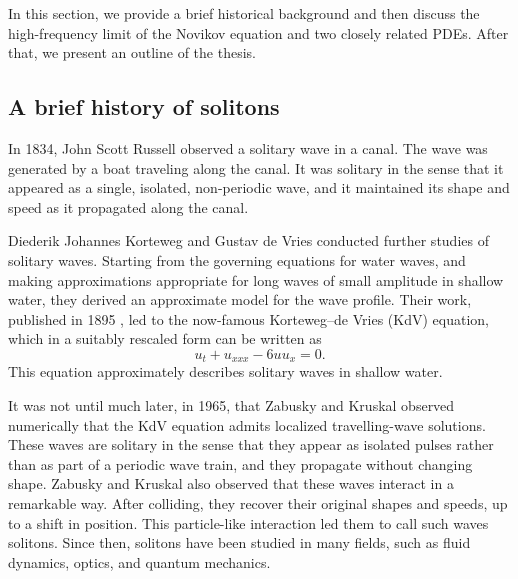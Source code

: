 \documentclass[english,master]{liumaiex}
\theoremstyle{thesisplain}
\theoremstyle{thesisdefinition}
\numberwithin{equation}{section}
\begin{document}
In this section, we provide a brief historical background and then discuss the high-frequency limit of the Novikov equation and two closely related PDEs. After that, we present an outline of the thesis.

\subsection{A brief history of solitons}

In 1834, John Scott Russell observed a solitary wave in a canal. The wave was generated by a boat traveling along the canal. It was solitary in the sense that it appeared as a single, isolated, non-periodic wave, and it maintained its shape and speed as it propagated along the canal.

Diederik Johannes Korteweg and Gustav de Vries conducted further studies of solitary waves. Starting from the governing equations for water waves, and making approximations appropriate for long waves of small amplitude in shallow water, they derived an approximate model for the wave profile. Their work, published in 1895 \cite{Korteweg_1895}, led to the now-famous Korteweg--de Vries (KdV) equation, which in a suitably rescaled form can be written as
\begin{equation}
    u_t + u_{xxx} - 6uu_x = 0.
\end{equation}
This equation approximately describes solitary waves in shallow water.

It was not until much later, in 1965, that Zabusky and Kruskal \cite{Zabusky_1965} observed numerically that the KdV equation admits localized travelling-wave solutions. These waves are solitary in the sense that they appear as isolated pulses rather than as part of a periodic wave train, and they propagate without changing shape. Zabusky and Kruskal also observed that these waves interact in a remarkable way. After colliding, they recover their original shapes and speeds, up to a shift in position. This particle-like interaction led them to call such waves solitons. Since then, solitons have been studied in many fields, such as fluid dynamics, optics, and quantum mechanics.
\end{document}
